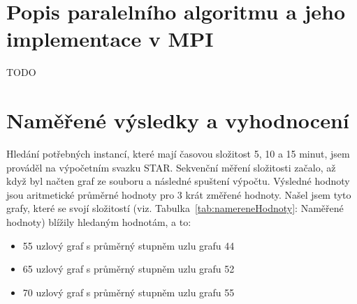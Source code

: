 \documentclass[11pt]{article}
\begin{document}
\section{Popis paralelního algoritmu a jeho implementace v MPI}
TODO


\section{Naměřené výsledky a vyhodnocení}

Hledání potřebných instancí, které mají časovou složitost 5, 10 a 15 minut, jsem prováděl na výpočetním svazku STAR. Sekvenční měření složitosti začalo, až když byl načten graf ze souboru a následné spuštení výpočtu. Výsledné hodnoty jsou aritmetické průměrné hodnoty pro 3 krát změřené hodnoty. Našel jsem tyto grafy, které se svojí složitostí (viz. Tabulka~\ref{tab:namereneHodnoty}: Naměřené hodnoty) blížily hledaným hodnotám, a to:

\begin{itemize}
	\item 55 uzlový graf s  průměrný stupněm uzlu grafu 44
	\item 65 uzlový graf s  průměrný stupněm uzlu grafu 52 
	\item 70 uzlový graf s  průměrný stupněm uzlu grafu 55
\end{itemize}
\end{document}
